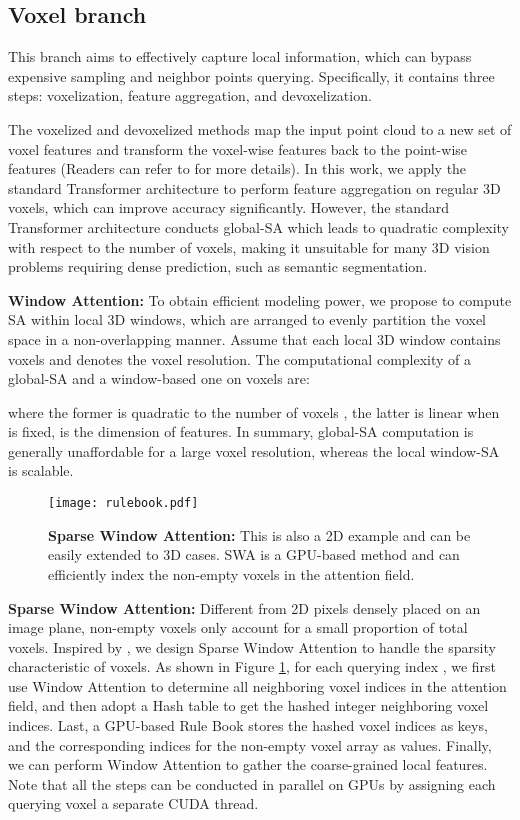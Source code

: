 \documentclass[10pt,twocolumn,letterpaper]{article}
\begin{document}
\subsection{Voxel branch} \label{section3.1}
This branch aims to effectively capture local information, which can bypass expensive sampling and neighbor points querying. Specifically, it contains three steps: voxelization, feature aggregation, and devoxelization.

The voxelized and devoxelized methods map the input point cloud  to a new set of voxel features  and transform the voxel-wise features back to the point-wise features  (Readers can refer to \cite{2019Point} for more details). In this work, we apply the standard Transformer architecture \cite{2017Attention} to perform feature aggregation on regular 3D voxels, which can improve accuracy significantly. However, the standard Transformer architecture conducts global-SA which leads to quadratic complexity with respect to the number of voxels, making it unsuitable for many 3D vision problems requiring dense prediction, such as semantic segmentation.

\textbf{Window Attention:} To obtain efficient modeling power, we propose to compute SA within local 3D windows, which are arranged to evenly partition the voxel space in a non-overlapping manner. Assume that each local 3D window contains  voxels and  denotes the voxel resolution. The computational complexity of a global-SA and a window-based one on  voxels are:

where the former is quadratic to the number of voxels , the latter is linear when  is fixed,  is the dimension of features. In summary, global-SA computation is generally unaffordable for a large voxel resolution, whereas the local window-SA is scalable.

\begin{figure}
    \centering
    \texttt{[image: rulebook.pdf]}
    \caption{\textbf{Sparse Window Attention: }This is also a 2D example and can be easily extended to 3D cases. SWA is a GPU-based method and can efficiently index the non-empty voxels in the attention field.}
    \label{SWA}
\end{figure}

\textbf{Sparse Window Attention:} Different from 2D pixels
densely placed on an image plane, non-empty voxels only account for a small proportion of total voxels. Inspired by \cite{sparse,SECOND}, we design Sparse Window Attention to handle the sparsity characteristic of voxels. As shown in Figure \ref{SWA}, for each querying index , we first use Window Attention to determine all neighboring voxel indices in the attention field, and then adopt a Hash table to get the hashed integer neighboring voxel indices. Last, a GPU-based Rule Book stores the hashed voxel indices as keys, and the corresponding indices for the non-empty voxel array as values. Finally, we can perform Window Attention to gather the coarse-grained local features. Note that all the steps can be conducted in parallel on GPUs by assigning each querying voxel  a separate CUDA thread.
\end{document}
